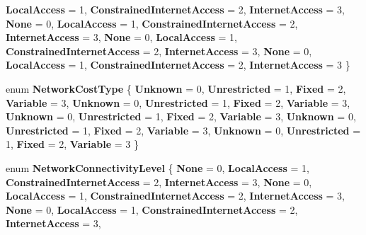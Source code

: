 \begin{DoxyCompactItemize}
{\bfseries Local\+Access} = 1, 
{\bfseries Constrained\+Internet\+Access} = 2, 
{\bfseries Internet\+Access} = 3, 
\newline
{\bfseries None} = 0, 
{\bfseries Local\+Access} = 1, 
{\bfseries Constrained\+Internet\+Access} = 2, 
{\bfseries Internet\+Access} = 3, 
\newline
{\bfseries None} = 0, 
{\bfseries Local\+Access} = 1, 
{\bfseries Constrained\+Internet\+Access} = 2, 
{\bfseries Internet\+Access} = 3, 
\newline
{\bfseries None} = 0, 
{\bfseries Local\+Access} = 1, 
{\bfseries Constrained\+Internet\+Access} = 2, 
{\bfseries Internet\+Access} = 3
 \}
\item 
\mbox{\label{namespace_windows_1_1_networking_1_1_connectivity_a1588bce4ba10673fae3a14c52de8ceb8}} 
enum {\bfseries Network\+Cost\+Type} \{ \newline
{\bfseries Unknown} = 0, 
{\bfseries Unrestricted} = 1, 
{\bfseries Fixed} = 2, 
{\bfseries Variable} = 3, 
\newline
{\bfseries Unknown} = 0, 
{\bfseries Unrestricted} = 1, 
{\bfseries Fixed} = 2, 
{\bfseries Variable} = 3, 
\newline
{\bfseries Unknown} = 0, 
{\bfseries Unrestricted} = 1, 
{\bfseries Fixed} = 2, 
{\bfseries Variable} = 3, 
\newline
{\bfseries Unknown} = 0, 
{\bfseries Unrestricted} = 1, 
{\bfseries Fixed} = 2, 
{\bfseries Variable} = 3, 
\newline
{\bfseries Unknown} = 0, 
{\bfseries Unrestricted} = 1, 
{\bfseries Fixed} = 2, 
{\bfseries Variable} = 3
 \}
\item 
\mbox{\label{namespace_windows_1_1_networking_1_1_connectivity_a2c33b149aa0f99f8a20a09851e23f36a}} 
enum {\bfseries Network\+Connectivity\+Level} \{ \newline
{\bfseries None} = 0, 
{\bfseries Local\+Access} = 1, 
{\bfseries Constrained\+Internet\+Access} = 2, 
{\bfseries Internet\+Access} = 3, 
\newline
{\bfseries None} = 0, 
{\bfseries Local\+Access} = 1, 
{\bfseries Constrained\+Internet\+Access} = 2, 
{\bfseries Internet\+Access} = 3, 
\newline
{\bfseries None} = 0, 
{\bfseries Local\+Access} = 1, 
{\bfseries Constrained\+Internet\+Access} = 2, 
{\bfseries Internet\+Access} = 3, 

\end{DoxyCompactItemize}
